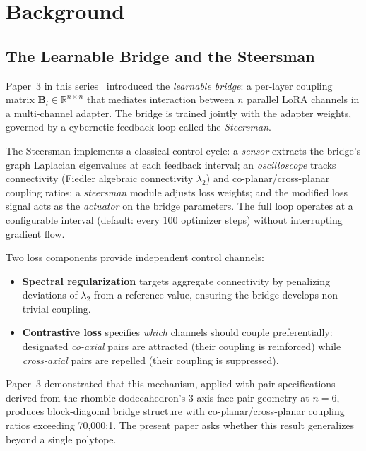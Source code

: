 \section{Background}
\label{sec:background}

\subsection{The Learnable Bridge and the Steersman}

Paper~3 in this series~\cite{bielec2026bridge} introduced the \emph{learnable bridge}:
a per-layer coupling matrix $\mathbf{B}_l \in \mathbb{R}^{n \times n}$ that
mediates interaction between $n$ parallel LoRA channels in a multi-channel
adapter. The bridge is trained jointly with the adapter weights, governed by
a cybernetic feedback loop called the \emph{Steersman}.

The Steersman implements a classical control cycle: a \emph{sensor} extracts
the bridge's graph Laplacian eigenvalues at each feedback interval; an
\emph{oscilloscope} tracks connectivity (Fiedler algebraic connectivity
$\lambda_2$) and co-planar/cross-planar coupling ratios; a \emph{steersman}
module adjusts loss weights; and the modified loss signal acts as the
\emph{actuator} on the bridge parameters. The full loop operates at a
configurable interval (default: every 100 optimizer steps) without
interrupting gradient flow.

Two loss components provide independent control channels:
\begin{itemize}
  \item \textbf{Spectral regularization} targets aggregate connectivity by
    penalizing deviations of $\lambda_2$ from a reference value, ensuring the
    bridge develops non-trivial coupling.
  \item \textbf{Contrastive loss} specifies \emph{which} channels should
    couple preferentially: designated \emph{co-axial} pairs are attracted
    (their coupling is reinforced) while \emph{cross-axial} pairs are repelled
    (their coupling is suppressed).
\end{itemize}

Paper~3 demonstrated that this mechanism, applied with pair specifications
derived from the rhombic dodecahedron's 3-axis face-pair geometry at $n{=}6$,
produces block-diagonal bridge structure with co-planar/cross-planar coupling
ratios exceeding 70{,}000:1. The present paper asks whether this result
generalizes beyond a single polytope.


